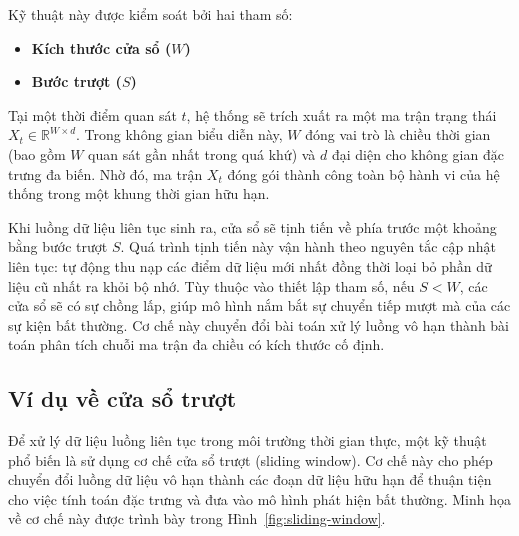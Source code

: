     Kỹ thuật này được kiểm soát bởi hai tham số:
    \begin{itemize}[label=--]
        \item \textbf{Kích thước cửa sổ ($W$)}
        \item \textbf{Bước trượt ($S$)}
    \end{itemize}
    Tại một thời điểm quan sát $t$, hệ thống sẽ trích xuất ra một ma trận trạng thái \textbf{$X_t \in \mathbb{R}^{W \times d}$}. Trong không gian biểu diễn này, $W$ đóng vai trò là chiều thời gian (bao gồm $W$ quan sát gần nhất trong quá khứ) và $d$ đại diện cho không gian đặc trưng đa biến. Nhờ đó, ma trận $X_t$ đóng gói thành công toàn bộ hành vi của hệ thống trong một khung thời gian hữu hạn.

    Khi luồng dữ liệu liên tục sinh ra, cửa sổ sẽ tịnh tiến về phía trước một khoảng bằng bước trượt $S$. Quá trình tịnh tiến này vận hành theo nguyên tắc cập nhật liên tục: tự động thu nạp các điểm dữ liệu mới nhất đồng thời loại bỏ phần dữ liệu cũ nhất ra khỏi bộ nhớ. Tùy thuộc vào thiết lập tham số, nếu $S < W$, các cửa sổ sẽ có sự chồng lấp, giúp mô hình nắm bắt sự chuyển tiếp mượt mà của các sự kiện bất thường. Cơ chế này chuyển đổi bài toán xử lý luồng vô hạn thành bài toán phân tích chuỗi ma trận đa chiều có kích thước cố định.
    \subsection*{Ví dụ về cửa sổ trượt}
    Để xử lý dữ liệu luồng liên tục trong môi trường thời gian thực, một kỹ thuật phổ biến là sử dụng cơ chế cửa sổ trượt (sliding window). Cơ chế này cho phép chuyển đổi luồng dữ liệu vô hạn thành các đoạn dữ liệu hữu hạn để thuận tiện cho việc tính toán đặc trưng và đưa vào mô hình phát hiện bất thường. Minh họa về cơ chế này được trình bày trong Hình~\ref{fig:sliding-window}.
    

